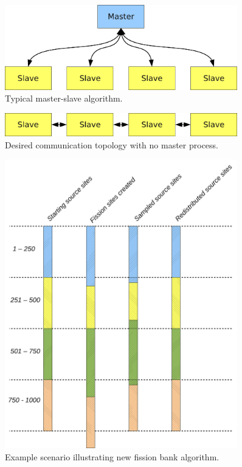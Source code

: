 \documentclass[11pt]{article}
\begin{document}
\clearpage
\begin{figure}[p]
  \centering
  \includegraphics[width=0.9\textwidth]{master-slave.pdf}
  \caption{Typical master-slave algorithm.}
  \label{fig:master-slave}
\end{figure}

\clearpage
\begin{figure}[p]
  \centering
  \includegraphics[width=0.9\textwidth]{slave-only.pdf}
  \caption{Desired communication topology with no master process.}
  \label{fig:slave-only}
\end{figure}

\clearpage
\begin{figure}[p]
  \centering
  \includegraphics[width=0.9\textwidth]{algorithm-new.pdf}
  \caption{Example scenario illustrating new fission bank algorithm.}
  \label{fig:algorithm-new}
\end{figure}
\end{document}
